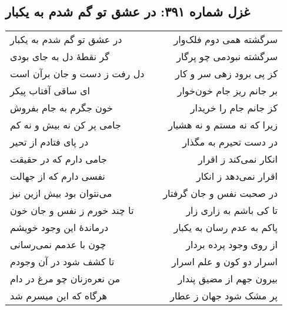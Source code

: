 \begin{center}
\section*{غزل شماره ۳۹۱: در عشق تو گم شدم به یکبار}
\label{sec:391}
\begin{longtable}{l p{0.5cm} r}
در عشق تو گم شدم به یکبار
&&
سرگشته همی دوم فلک‌وار
\\
گر نقطهٔ دل به جای بودی
&&
سرگشته نبودمی چو پرگار
\\
دل رفت ز دست و جان برآن است
&&
کز پی برود زهی سر و کار
\\
ای ساقی آفتاب پیکر
&&
بر جانم ریز جام خون‌خوار
\\
خون جگرم به جام بفروش
&&
کز جانم جام را خریدار
\\
جامی پر کن نه بیش و نه کم
&&
زیرا که نه مستم و نه هشیار
\\
در پای فتادم از تحیر
&&
در دست تحیرم به مگذار
\\
جامی دارم که در حقیقت
&&
انکار نمی‌کند ز اقرار
\\
نفسی دارم که از جهالت
&&
اقرار نمی‌دهد ز انکار
\\
می‌نتوان بود بیش ازین نیز
&&
در صحبت نفس و جان گرفتار
\\
تا چند خورم ز نفس و جان خون
&&
تا کی باشم به زاری زار
\\
درماندهٔ این وجود خویشم
&&
پاکم به عدم رسان به یکبار
\\
چون با عدمم نمی‌رسانی
&&
از روی وجود پرده بردار
\\
تا کشف شود در آن وجودم
&&
اسرار دو کون و علم اسرار
\\
من نعره‌زنان چو مرغ در دام
&&
بیرون جهم از مضیق پندار
\\
هرگاه که این میسرم شد
&&
پر مشک شود جهان ز عطار
\\
\end{longtable}
\end{center}
